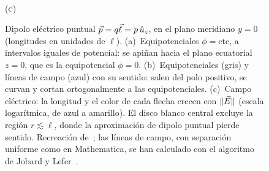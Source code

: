 \begin{figure}[t]
\begin{minipage}[t]{0.325\textwidth}
\\[1pt]{\small\scshape (c)}
\end{minipage}
\caption{Dipolo eléctrico puntual $\vec{p}=q\vec{\ell}=p\,\hat{u}_{z}$, en el plano meridiano $y=0$ (longitudes en unidades de $\ell$).
(a)~Equipotenciales $\phi=\text{cte}$, a intervalos iguales de potencial: se apiñan hacia el plano ecuatorial $z=0$, que es la
equipotencial $\phi=0$. (b)~Equipotenciales (gris) y líneas de campo (azul) con su sentido: salen del polo positivo, se curvan y
cortan ortogonalmente a las equipotenciales. (c)~Campo eléctrico: la longitud y el color de cada flecha crecen con
$\lVert \vec{E}\rVert$ (escala logarítmica, de azul a amarillo). El disco blanco central excluye la región $r\lesssim\ell$, donde la
aproximación de dipolo puntual pierde sentido. Recreación de~\cite{FIGURAS-T2}; las líneas de campo, con separación uniforme como en Mathematica, se han
calculado con el algoritmo de Jobard y Lefer~\cite{JOBARD}.}
\label{fig:dipolo-mma}
\end{figure}
